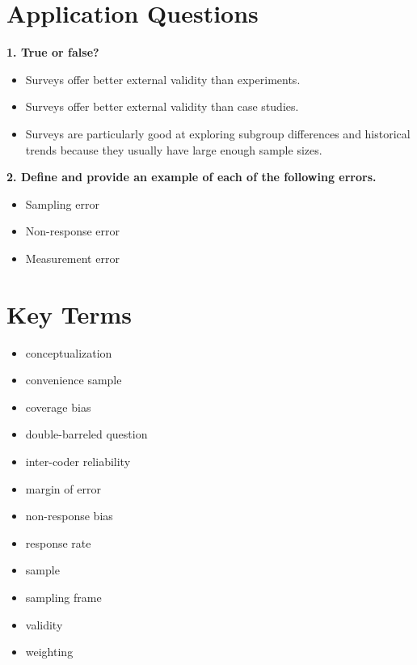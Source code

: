 \documentclass{book}
\providecommand{\tightlist}{%
  \setlength{\itemsep}{0pt}\setlength{\parskip}{0pt}}
\begin{document}
\hypertarget{application-questions-4}{%
\section{Application Questions}\label{application-questions-4}}

\textbf{1. True or false?}

\begin{itemize}
\tightlist
\item
  Surveys offer better external validity than experiments.
\item
  Surveys offer better external validity than case studies.
\item
  Surveys are particularly good at exploring subgroup differences and
  historical trends because they usually have large enough sample sizes.
\end{itemize}

\textbf{2. Define and provide an example of each of the following errors.}

\begin{itemize}
\tightlist
\item
  Sampling error
\item
  Non-response error
\item
  Measurement error
\end{itemize}

\hypertarget{key-terms-3}{%
\section{Key Terms}\label{key-terms-3}}

\begin{itemize}
\tightlist
\item
  conceptualization
\item
  convenience sample
\item
  coverage bias
\item
  double-barreled question
\item
  inter-coder reliability
\item
  margin of error
\item
  non-response bias
\item
  response rate
\item
  sample
\item
  sampling frame
\item
  validity
\item
  weighting
\end{itemize}
\end{document}

